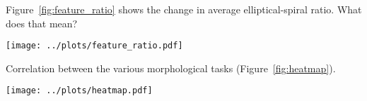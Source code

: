 \documentclass[iop,apj,tighten]{emulateapj}
\begin{document}
Figure~\ref{fig:feature_ratio} shows the change in average elliptical-spiral ratio. What does that mean?

\begin{figure*}
\centering
\texttt{[image: ../plots/feature\_ratio.pdf]}
\caption{Average spiral-elliptical ratio for various galaxy samples as a function of optical $(u-r)$ color. From left to right, curves are for the GZ2 main spectroscopic sample, the deeper Stripe~82 coadded images, and the DECaLS images. Colors/linestyles show different volume/absolute magnitude limits for each sample.\label{fig:feature_ratio}}
\end{figure*}

Correlation between the various morphological tasks (Figure~\ref{fig:heatmap}).

\begin{figure*}
\centering
\texttt{[image: ../plots/heatmap.pdf]}
\caption{Correlation matrix between the various tasks in the GZ-DECaLS decision tree. Lower left and upper right corners show the same (mirrored) sets of data.\label{fig:heatmap}}
\end{figure*}

\acknowledgments{
}



\end{document}

